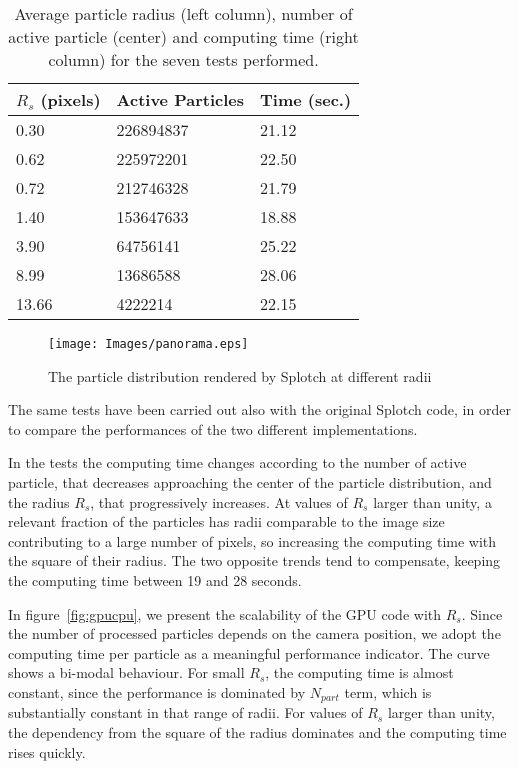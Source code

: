 \documentclass[11pt]{article}
\begin{document}
\begin{table}
\caption{Average particle radius (left column), number of active particle (center)
and computing time (right column) for the seven tests performed.}
\begin{center}
\begin{tabular}{|l|l|l|}
\hline
$R_s$ (pixels) & Active Particles & Time (sec.) \\
\hline
0.30   & 226894837  & 21.12 \\
\hline
0.62   & 225972201  & 22.50 \\
\hline
0.72   & 212746328  & 21.79 \\
\hline
1.40   & 153647633  & 18.88 \\
\hline
3.90   & 64756141   & 25.22 \\
\hline
8.99   & 13686588   & 28.06 \\
\hline
13.66  & 4222214    & 22.15 \\
\hline
\end{tabular}
\end{center}
\label{tab:radius}
\end{table}


\begin{figure}
\centering
\texttt{[image: Images/panorama.eps]}
\caption{The particle distribution rendered by Splotch at different radii}
\label{fig:panorama}
\end{figure}

The same tests have been carried out also with the original Splotch code, in order 
to compare the performances of the two different implementations. 

In the tests the computing time changes according
to the number of active particle, that decreases approaching the center of the particle 
distribution, and the radius $R_s$, that progressively increases. At values of 
$R_s$ larger than unity, a relevant fraction of the particles has radii comparable to the image size
contributing to a large number of pixels, so increasing the computing time 
with the square of their radius. The two opposite trends tend to compensate, keeping  
the computing time between 19 and 28 seconds.


In figure~\ref{fig:gpucpu}, we present the scalability of the GPU code 
with $R_s$. Since the number of processed particles depends on
the camera position, we adopt the  
computing time per particle as a meaningful performance
indicator. The curve shows a bi-modal behaviour. For small $R_s$,
the computing time is almost constant, since the performance is dominated
by $N_{part}$ term, which is substantially constant in that range of 
radii. For values of $R_s$ larger 
than unity, the dependency from the square of the radius dominates and the computing time 
rises quickly. 
\end{document}
